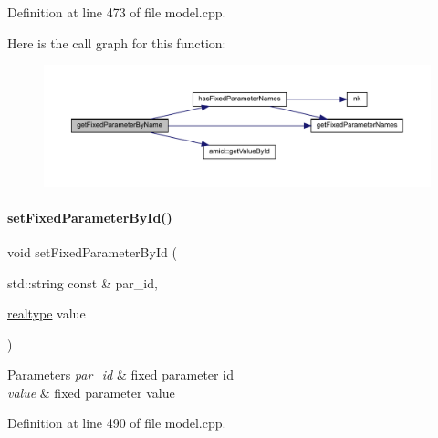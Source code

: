 Definition at line 473 of file model.\+cpp.

Here is the call graph for this function\+:
\nopagebreak
\begin{figure}[H]
\begin{center}
\leavevmode
\includegraphics[width=350pt]{classamici_1_1_model_a99cc00a08b2f2d87d3eac047d00a7c57_cgraph}
\end{center}
\end{figure}
\mbox{\label{classamici_1_1_model_adc0d24343c6fed2e797fb402f7c2d256}} 
\paragraph{\texorpdfstring{set\+Fixed\+Parameter\+By\+Id()}{setFixedParameterById()}}
{\footnotesize\ttfamily void set\+Fixed\+Parameter\+By\+Id (\begin{DoxyParamCaption}\item[{std\+::string const \&}]{par\+\_\+id,  }\item[{\mbox{\hyperlink{namespaceamici_a1bdce28051d6a53868f7ccbf5f2c14a3}{realtype}}}]{value }\end{DoxyParamCaption})}


\begin{DoxyParams}{Parameters}
{\em par\+\_\+id} & fixed parameter id \\
\hline
{\em value} & fixed parameter value \\
\hline
\end{DoxyParams}


Definition at line 490 of file model.\+cpp.

